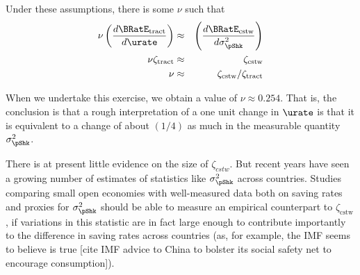 \documentclass[../../cjSOE.tex]{subfiles}
\begin{document}
Under these assumptions, there is some $\nu$ such that
\begin{eqnarray}
  \nu \left(\frac{d \BRatE_{\text{tract}}}{d \urate}\right) & \approx & \left(\frac{d \BRatE_{\text{cstw}}}{d \sigma^{2}_{\pShk}}\right) \\
  \nu \zeta_{\text{tract}} & \approx & \zeta_{\text{cstw}}
  \\ \nu & \approx & \zeta_{\text{cstw}}/\zeta_{\text{tract}}                                 \end{eqnarray}

When we undertake this exercise, we obtain a value of $\nu \approx 0.254$.  That is, the
conclusion is that a rough interpretation of a one unit change in $\urate$ is that it
is equivalent to a change of about $(1/4)$ as much in the measurable quantity $\sigma^{2}_{\pShk}$.

There is at present little evidence on the size of $\zeta_{cstw}$.  But recent years have seen a growing number of estimates of statistics like $\sigma^{2}_{\pShk}$ across countries.  Studies comparing small open economies with well-measured data both on saving rates and proxies for $\sigma^{2}_{\pShk}$ should be able to measure an empirical counterpart to $\zeta_{\text{cstw}}$, if variations in this statistic are in fact large enough to contribute importantly to the difference in saving rates across countries (as, for example, the IMF seems to believe is true [cite IMF advice to China to bolster its social safety net to encourage consumption]).

%

%
%
\end{document}
